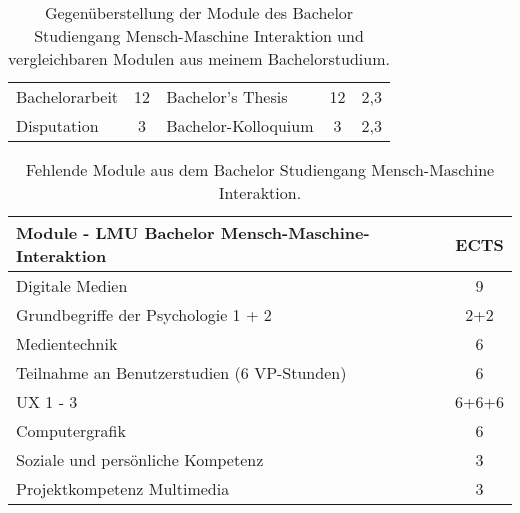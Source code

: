 \documentclass[11pt, a4paper]{awesome-cv}
\begin{document}
\begin{table*}
\begin{tabularx}{\textwidth}{|X|c|X|c|c|}
    Bachelorarbeit                                         & 12   & Bachelor's Thesis                              & 12   & 2,3  \\

    \rowcolor{awesome!25}
    Disputation                                            & 3    & Bachelor-Kolloquium                            & 3    & 2,3  \\
    \hline
  \end{tabularx}
  \label{table:1}
  \caption{Gegenüberstellung der Module des Bachelor Studiengang Mensch-Maschine Interaktion und vergleichbaren Modulen aus meinem Bachelorstudium.}
\end{table*}

\begin{table*}
  \scriptsize
  \centering
  \begin{tabularx}{.5\textwidth}{|X|c|}

    \hline
    Module - LMU Bachelor Mensch-Maschine-Interaktion & ECTS  \\
    \hline

    Digitale Medien                                   & 9     \\

    \rowcolor{awesome!25}
    Grundbegriffe der Psychologie 1 + 2               & 2+2   \\

    Medientechnik                                     & 6     \\

    \rowcolor{awesome!25}
    Teilnahme an Benutzerstudien (6 VP-Stunden)       & 6     \\

    UX 1 - 3                                          & 6+6+6 \\

    \rowcolor{awesome!25}
    Computergrafik                                    & 6     \\

    Soziale und persönliche Kompetenz                 & 3     \\

    \rowcolor{awesome!25}
    Projektkompetenz Multimedia                       & 3     \\
    \hline
  \end{tabularx}
  \label{table:2}
  \caption{Fehlende Module aus dem Bachelor Studiengang Mensch-Maschine Interaktion.}
\end{table*}
\end{document}
